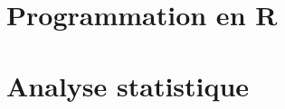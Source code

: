 \documentclass[aspectratio=1610,10pt,xcolor=x11names,english,french]{beamer}
\begin{document}





\part{Programmation en R}
\frame{\partpage}








\part{Analyse statistique}
\frame{\partpage}






\end{document}
